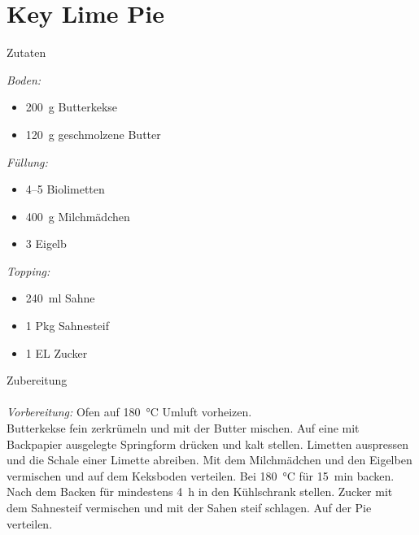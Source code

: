 \section*{Key Lime Pie}
\ihead{}\ohead{}
\cfoot{}
{\Large Zutaten}
\begin{multicols}{2}
\textit{Boden:}
\begin{itemize}
    \item \SI{200}{g} Butterkekse
    \item \SI{120}{g} geschmolzene Butter
\end{itemize}
\textit{Füllung:}
\begin{itemize}
    \item \numrange{4}{5} Biolimetten
    \item \SI{400}{g} Milchmädchen
    \item \num{3} Eigelb
\end{itemize}
\textit{Topping:}
\begin{itemize}
    \item \SI{240}{ml} Sahne
    \item \num{1} Pkg Sahnesteif
    \item \num{1} EL Zucker
\end{itemize}
\end{multicols}
\noindent
{\Large Zubereitung}\\
\\
\textit{Vorbereitung:} Ofen auf \SI{180}{\celsius} Umluft vorheizen.\\
Butterkekse fein zerkrümeln und mit der Butter mischen. 
Auf eine mit Backpapier ausgelegte Springform drücken und kalt stellen.
Limetten auspressen und die Schale einer Limette abreiben.
Mit dem Milchmädchen und den Eigelben vermischen und auf dem Keksboden verteilen.
Bei \SI{180}{\celsius} für \SI{15}{min} backen.
Nach dem Backen für mindestens \SI{4}{h} in den Kühlschrank stellen.
Zucker mit dem Sahnesteif vermischen und mit der Sahen steif schlagen. 
Auf der Pie verteilen.